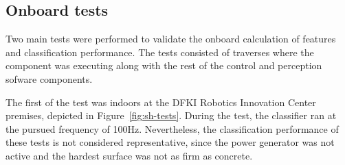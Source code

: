 \documentclass{article}
\begin{document}


\subsection{Onboard tests}

Two main tests were performed to validate the onboard calculation of features and classification performance.
The tests consisted of traverses where the component was executing along with the rest of the control and perception sofware components. 

The first of the test was indoors at the DFKI Robotics Innovation Center premises, depicted in Figure~\ref{fig:sh-tests}.
During the test, the classifier ran at the pursued frequency of 100Hz.
Nevertheless, the classification performance of these tests is not considered representative, since the power generator was not active and the hardest surface was not as firm as concrete. 
\end{document}
